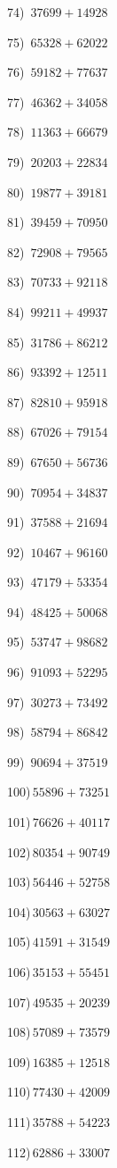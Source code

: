 \documentclass{article}
\begin{document}
\begin{multicols}{2}
74)$\,\,\,37699+14928$ \par 
75)$\,\,\,65328+62022$ \par 
76)$\,\,\,59182+77637$ \par 
77)$\,\,\,46362+34058$ \par 
78)$\,\,\,11363+66679$ \par 
79)$\,\,\,20203+22834$ \par 
80)$\,\,\,19877+39181$ \par 
81)$\,\,\,39459+70950$ \par 
82)$\,\,\,72908+79565$ \par 
83)$\,\,\,70733+92118$ \par 
84)$\,\,\,99211+49937$ \par 
85)$\,\,\,31786+86212$ \par 
86)$\,\,\,93392+12511$ \par 
87)$\,\,\,82810+95918$ \par 
88)$\,\,\,67026+79154$ \par 
89)$\,\,\,67650+56736$ \par 
90)$\,\,\,70954+34837$ \par 
91)$\,\,\,37588+21694$ \par 
92)$\,\,\,10467+96160$ \par 
93)$\,\,\,47179+53354$ \par 
94)$\,\,\,48425+50068$ \par 
95)$\,\,\,53747+98682$ \par 
96)$\,\,\,91093+52295$ \par 
97)$\,\,\,30273+73492$ \par 
98)$\,\,\,58794+86842$ \par 
99)$\,\,\,90694+37519$ \par 
100)$\,55896+73251$ \par 
101)$\,76626+40117$ \par 
102)$\,80354+90749$ \par 
103)$\,56446+52758$ \par 
104)$\,30563+63027$ \par 
105)$\,41591+31549$ \par 
106)$\,35153+55451$ \par 
107)$\,49535+20239$ \par 
108)$\,57089+73579$ \par 
109)$\,16385+12518$ \par 
110)$\,77430+42009$ \par 
111)$\,35788+54223$ \par 
112)$\,62886+33007$ \par 

\end{multicols}
\end{document}
